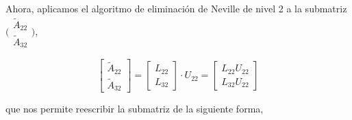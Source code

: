 \documentclass[a4paper,12pt]{article}
\begin{document}
\bigskip

Ahora, aplicamos el algoritmo de eliminaci\'on de Neville de nivel 2 a la submatriz $\bigl(\begin{smallmatrix}
\widetilde{A}_{22}\\ \widetilde{A}_{32}
\end{smallmatrix} \bigr)$,

\begin{equation}
	\begin{bmatrix}
		\widetilde{A}_{22} \\
		\widetilde{A}_{32}
	\end{bmatrix}
	=
	\begin{bmatrix}
		L_{22} \\
		L_{32}
	\end{bmatrix}
	\cdot
	U_{22}
	=
	\begin{bmatrix}
		L_{22} U_{22} \\
		L_{32} U_{22}
	\end{bmatrix}
\end{equation}

que nos permite reescribir la submatriz de la siguiente forma,
\end{document}
